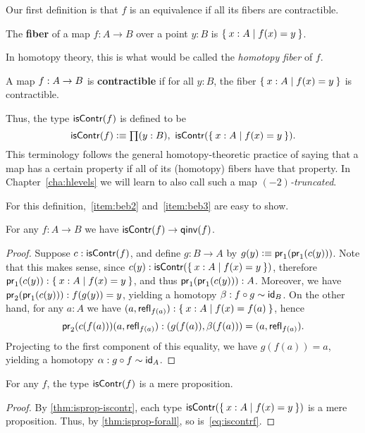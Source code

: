 Our first definition is that $f$ is an equivalence if all its fibers are contractible.

\begin{defn}
  The \textbf{fiber} of a map $f:A\to B$ over a point $y:B$ is $\setof{x:A | f(x) = y}$.
\end{defn}

In homotopy theory, this is what would be called the \emph{homotopy fiber} of $f$.

\begin{defn}\label{defn:equivalence}
  A map $f:A\ra B$ is \textbf{contractible} if for all $y:B$, the fiber $\setof{x:A | f(x) = y}$ is contractible.
\end{defn}

Thus, the type $\iscontr(f)$ is defined to be
\begin{equation}
  \iscontr(f) \defeq \prd{y:B} \iscontr (\setof{x:A | f(x) = y}).\label{eq:iscontrf}
\end{equation}
This terminology follows the general homotopy-theoretic practice of saying that a map has a certain property if all of its (homotopy) fibers have that property.
In Chapter~\ref{cha:hlevels} we will learn to also call such a map \emph{$(-2)$-truncated}.

For this definition,~\ref{item:beb2} and~\ref{item:beb3} are easy to show.

\begin{lem}
  For any $f:A\to B$ we have $\iscontr(f)\to\qinv(f)$.
\end{lem}
\begin{proof}
  Suppose $c:\iscontr(f)$, and define $g:B\to A$ by $g(y)\defeq \proj1(\proj1(c(y)))$.
  Note that this makes sense, since $c(y):\iscontr (\setof{x:A | f(x) = y})$, therefore $\proj1(c(y)):\setof{x:A | f(x) = y}$, and thus $\proj1(\proj1(c(y))) : A$.
  Moreover, we have $\proj2(\proj1(c(y))) : f(g(y))=y$, yielding a homotopy $\beta:f\circ g\htpy \idfunc[B]$.
  On the other hand, for any $a:A$ we have $(a,\refl{f(a)}) : \setof{x:A | f(x) = f(a)}$, hence
  \[\proj2(c(f(a)))(a,\refl{f(a)}) : (g(f(a)),\beta(f(a))) = (a,\refl{f(a)}).\]
  Projecting to the first component of this equality, we have $g(f(a))=a$, yielding a homotopy $\alpha:g\circ f \htpy \idfunc[A]$.
\end{proof}

\begin{lem}
  For any $f$, the type $\iscontr(f)$ is a mere proposition.
\end{lem}
\begin{proof}
  By \autoref{thm:isprop-iscontr}, each type $\iscontr (\setof{x:A | f(x) = y})$ is a mere proposition.
  Thus, by \autoref{thm:isprop-forall}, so is~\eqref{eq:iscontrf}.
\end{proof}

